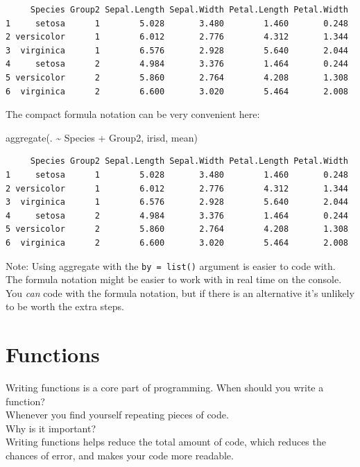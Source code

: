 \documentclass[
]{book}
\newenvironment{Shaded}{\begin{snugshade}}{\end{snugshade}}
\newcommand{\FunctionTok}[1]{\textcolor[rgb]{0.00,0.00,0.00}{#1}}
\newcommand{\NormalTok}[1]{#1}
\newcommand{\SpecialCharTok}[1]{\textcolor[rgb]{0.00,0.00,0.00}{#1}}
\begin{document}
\begin{verbatim}
     Species Group2 Sepal.Length Sepal.Width Petal.Length Petal.Width
1     setosa      1        5.028       3.480        1.460       0.248
2 versicolor      1        6.012       2.776        4.312       1.344
3  virginica      1        6.576       2.928        5.640       2.044
4     setosa      2        4.984       3.376        1.464       0.244
5 versicolor      2        5.860       2.764        4.208       1.308
6  virginica      2        6.600       3.020        5.464       2.008
\end{verbatim}

The compact formula notation can be very convenient here:

\begin{Shaded}
\begin{Highlighting}[]
\FunctionTok{aggregate}\NormalTok{(. }\SpecialCharTok{\textasciitilde{}}\NormalTok{ Species }\SpecialCharTok{+}\NormalTok{ Group2, irisd, mean)}
\end{Highlighting}
\end{Shaded}

\begin{verbatim}
     Species Group2 Sepal.Length Sepal.Width Petal.Length Petal.Width
1     setosa      1        5.028       3.480        1.460       0.248
2 versicolor      1        6.012       2.776        4.312       1.344
3  virginica      1        6.576       2.928        5.640       2.044
4     setosa      2        4.984       3.376        1.464       0.244
5 versicolor      2        5.860       2.764        4.208       1.308
6  virginica      2        6.600       3.020        5.464       2.008
\end{verbatim}

Note: Using aggregate with the \texttt{by\ =\ list()} argument is easier to code with. The formula notation might be easier to work with in real time on the console. You \emph{can} code with the formula notation, but if there is an alternative it's unlikely to be worth the extra steps.

\hypertarget{functions}{%
\chapter{Functions}\label{functions}}

Writing functions is a core part of programming.
When should you write a function?\\
Whenever you find yourself repeating pieces of code.\\
Why is it important?\\
Writing functions helps reduce the total amount of code, which reduces the chances of error, and makes your code more readable.
\end{document}
